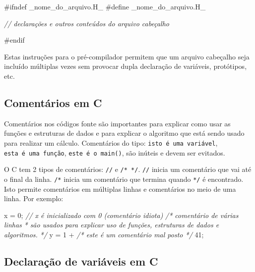 \documentclass[
]{article}
\newenvironment{Shaded}{}{}
\newcommand{\CommentTok}[1]{\textcolor[rgb]{0.38,0.63,0.69}{\textit{#1}}}
\newcommand{\DecValTok}[1]{\textcolor[rgb]{0.25,0.63,0.44}{#1}}
\newcommand{\NormalTok}[1]{#1}
\newcommand{\PreprocessorTok}[1]{\textcolor[rgb]{0.74,0.48,0.00}{#1}}
\begin{document}
\begin{Shaded}
\begin{Highlighting}[]
\PreprocessorTok{#ifndef _nome_do_arquivo.H_}
\PreprocessorTok{#define _nome_do_arquivo.H_}

\CommentTok{// declarações e outros conteúdos do arquivo cabeçalho}

\PreprocessorTok{#endif}
\end{Highlighting}
\end{Shaded}

Estas instruções para o pré-compilador permitem que um arquivo cabeçalho
seja incluído múltiplas vezes sem provocar dupla declaração de
variáveis, protótipos, etc.

\hypertarget{comentuxe1rios-em-c}{%
\subsection{Comentários em C}\label{comentuxe1rios-em-c}}

Comentários nos códigos fonte são importantes para explicar como usar as
funções e estruturas de dados e para explicar o algoritmo que está sendo
usado para realizar um cálculo. Comentários do tipo:
\texttt{isto\ é\ uma\ variável}, \texttt{esta\ é\ uma\ função},
\texttt{este\ é\ o\ main()}, são inúteis e devem ser evitados.

O C tem 2 tipos de comentários: \texttt{//} e \texttt{/*\ */}.
\texttt{//} inicia um comentário que vai até o final da linha.
\texttt{/*} inicia um comentário que termina quando \texttt{*/} é
encontrado. Isto permite comentários em múltiplas linhas e comentários
no meio de uma linha. Por exemplo:

\begin{Shaded}
\begin{Highlighting}[]
\NormalTok{  x = }\DecValTok{0}\NormalTok{; }\CommentTok{// x é inicializado com 0 (comentário idiota)}
  \CommentTok{/* comentário de várias linhas}
\CommentTok{   * são usados para explicar uso de funções, estruturas de dados e algoritmos.}
\CommentTok{   */}
\NormalTok{  y = }\DecValTok{1}\NormalTok{ + }\CommentTok{/* este é um comentário mal posto */} \DecValTok{41}\NormalTok{;}
\end{Highlighting}
\end{Shaded}

\hypertarget{declarauxe7uxe3o-de-variuxe1veis-em-c}{%
\subsection{Declaração de variáveis em
C}\label{declarauxe7uxe3o-de-variuxe1veis-em-c}}
\end{document}
